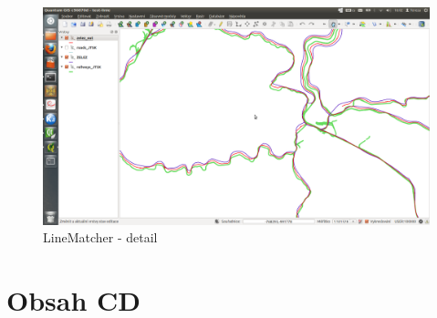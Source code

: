   \begin{figure}[H]
    \centering
      \includegraphics[width=400pt]{./pictures/test-lm3.png}
      \caption{LineMatcher - detail}
      \label{fig:lm3}
  \end{figure}  

\chapter{Obsah CD}
\label{priloha-obsahCD}